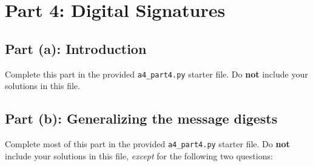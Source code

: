 \documentclass[11pt]{article}
\begin{document}
\section*{Part 4: Digital Signatures}

\subsection*{Part (a): Introduction}

Complete this part in the provided \texttt{a4\_part4.py} starter file.
Do \textbf{not} include your solutions in this file.

\subsection*{Part (b): Generalizing the message digests}

Complete most of this part in the provided \texttt{a4\_part4.py} starter file.
Do \textbf{not} include your solutions in this file, \emph{except} for the following two questions:
\end{document}
